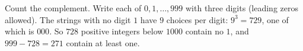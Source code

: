 Count the complement. Write each of $0,1,\dots,999$ with three digits (leading zeros allowed). The strings with no digit $1$ have $9$ choices per digit: $9^3=729$, one of which is $000$. So $728$ positive integers below $1000$ contain no $1$, and $999-728=\boxed{271}$ contain at least one.
